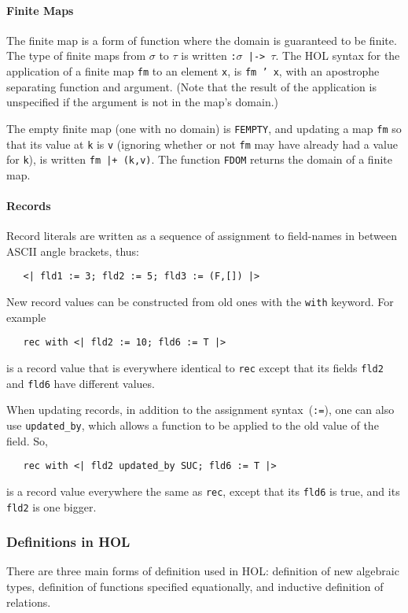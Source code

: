 \documentclass[11pt]{article}
\begin{document}
\paragraph{Finite Maps}
The finite map is a form of function where the domain is guaranteed to
be finite.  The type of finite maps from $\sigma$ to $\tau$ is written
\texttt{:$\sigma$~|->~$\tau$}.  The HOL syntax for the application of
a finite map \texttt{fm} to an element \texttt{x}, is \texttt{fm~'~x},
with an apostrophe separating function and argument.  (Note that the
result of the application is unspecified if the argument is not in the
map's domain.)

The empty finite map (one with no domain) is \texttt{FEMPTY}, and
updating a map \texttt{fm} so that its value at \texttt{k} is
\texttt{v} (ignoring whether or not \texttt{fm} may have already had a
value for \texttt{k}), is written \texttt{fm |+ (k,v)}.  The function
\texttt{FDOM} returns the domain of a finite map.

\paragraph{Records}
Record literals are written as a sequence of assignment to field-names
in between ASCII angle brackets, thus:
\begin{verbatim}
   <| fld1 := 3; fld2 := 5; fld3 := (F,[]) |>
\end{verbatim}
New record values can be constructed from old ones with the
\texttt{with} keyword.  For example
\begin{verbatim}
   rec with <| fld2 := 10; fld6 := T |>
\end{verbatim}
is a record value that is everywhere identical to \texttt{rec} except
that its fields \texttt{fld2} and \texttt{fld6} have different
values.

When updating records, in addition to the assignment
syntax~(\texttt{:=}), one can also use \texttt{updated_by}, which
allows a function to be applied to the old value of the field.  So,
\begin{verbatim}
   rec with <| fld2 updated_by SUC; fld6 := T |>
\end{verbatim}
is a record value everywhere the same as \texttt{rec}, except that its
\texttt{fld6} is true, and its \texttt{fld2} is one bigger.

\subsubsection{Definitions in HOL}
There are three main forms of definition used in HOL: definition of
new algebraic types, definition of functions specified equationally,
and inductive definition of relations.
\end{document}
